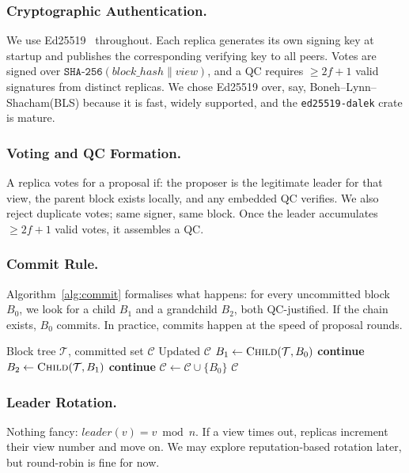 \documentclass{SVProc}
\begin{document}
\subsubsection{Cryptographic Authentication.}
We use Ed25519~\cite{ed25519} throughout.  Each replica generates its own signing key at startup and publishes the corresponding verifying key to all peers. Votes are signed over
$\texttt{SHA-256}(\mathit{block\_hash} \| \mathit{view})$, and a QC requires $\ge 2f{+}1$ valid signatures from distinct replicas.  We chose Ed25519 over, say, Boneh–Lynn–Shacham(BLS) because it is fast, widely supported, and the \texttt{ed25519-dalek} crate is mature.

\subsubsection{Voting and QC Formation.}
A replica votes for a proposal if: the proposer is the legitimate
leader for that view, the parent block exists locally, and any embedded QC verifies. We also reject duplicate votes; same signer, same block. Once the leader accumulates $\ge 2f{+}1$ valid votes, it assembles a QC.

\subsubsection{Commit Rule.}
Algorithm~\ref{alg:commit} formalises what happens: for every
uncommitted block $B_0$, we look for a child $B_1$ and a grandchild $B_2$, both QC-justified.  If the chain exists, $B_0$ commits. In practice, commits happen at the speed of proposal rounds.

\begin{algorithm}[t]
\caption{3-chain commit detection}
\label{alg:commit}
\begin{algorithmic}[1]
\REQUIRE Block tree $\mathcal{T}$, committed set $\mathcal{C}$
\ENSURE Updated $\mathcal{C}$
    \STATE $B_1 \gets \textsc{Child}(\mathcal{T}, B_0)$
        \STATE \textbf{continue}
    \ENDIF
    \STATE $B_2 \gets \textsc{Child}(\mathcal{T}, B_1)$
        \STATE \textbf{continue}
    \ENDIF
    \STATE $\mathcal{C} \gets \mathcal{C} \cup \{B_0\}$
\ENDFOR
\RETURN $\mathcal{C}$
\end{algorithmic}
\end{algorithm}

\subsubsection{Leader Rotation.}
Nothing fancy: $\textit{leader}(v) = v \bmod n$.  If a view times out, replicas increment their view number and move on.  We may explore reputation-based rotation later, but round-robin is fine for now.
\end{document}
